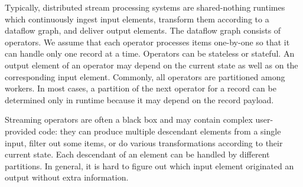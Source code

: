 \label {fs-acker-motivation}

Typically, distributed stream processing systems are shared-nothing runtimes which continuously ingest input elements, transform them according to a dataflow graph, and deliver output elements. The dataflow graph consists of operators. We assume that each operator processes items one-by-one so that it can handle only one record at a time. Operators can be stateless or stateful. An output element of an operator may depend on the current state as well as on the corresponding input element. Commonly, all operators are partitioned among workers. In most cases, a partition of the next operator for a record can be determined only in runtime because it may depend on the record payload. 

Streaming operators are often a black box and may contain complex user-provided code: they can produce multiple descendant elements from a single input, filter out some items, or do various transformations according to their current state. Each descendant of an element can be handled by different partitions. In general, it is hard to figure out which input element originated an output without extra information.


